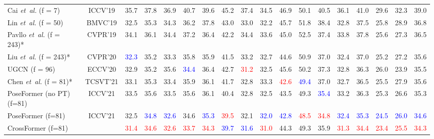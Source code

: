 \documentclass[runningheads]{llncs}
\newcommand{\latinphrase}[1]{\textit{#1}}
\newcommand{\etal}{\latinphrase{et~al.}\xspace}
\begin{document}
\begin{table*}[t]
{\begin{tabular}{l|c|ccccccccccccccc|c}
 Cai \etal \cite{cai2019exploiting} (f = 7) 
& ICCV\textquoteright 19  & 35.7  & 37.8  & 36.9  & 40.7  & 39.6  & 45.2  & 37.4  & 34.5 & 46.9  & 50.1  & 40.5  & 36.1  & 41.0  & 29.6  & 32.3  & 39.0\tabularnewline

Lin \etal \cite{lin2019trajectory} (f = 50)
 & BMVC\textquoteright 19  & 32.5  & 35.3  & 34.3  & 36.2  & 37.8  & 43.0  & 33.0  & 32.2  & 45.7  & 51.8  & 38.4  & 32.8  & 37.5  & 25.8  & 28.9  & 36.8\tabularnewline

Pavllo \etal \cite{pavllo20193d} (f = 243)* 
 & CVPR\textquoteright 19  & 34.1  & 36.1  & 34.4  & 37.2  & 36.4  & 42.2  & 34.4  & 33.6  & 45.0  & 52.5  & 37.4  & 33.8  & 37.8  & 25.6  & 27.3  & 36.5\tabularnewline

Liu \etal \cite{liu2020attention} (f = 243)* 
 & CVPR\textquoteright 20  &\textcolor{blue}{32.3}  & 35.2  & 33.3  & 35.8  & 35.9  & 41.5  & 33.2  & 32.7  & 44.6  & 50.9  & 37.0  & 32.4  & 37.0  & 25.2  & 27.2  & 35.6\tabularnewline

UGCN \cite{wang2020motion} (f = 96) 
 & ECCV\textquoteright 20 & 32.9  & 35.2  & 35.6  & \textcolor{blue}{34.4}  & 36.4  & 42.7  & \textcolor{red}{31.2}  & 32.5  & 45.6  & 50.2  & 37.3  & 32.8  & 36.3  & 26.0  & 23.9  & 35.5\tabularnewline

Chen \etal \cite{chen2021anatomy} (f = 81)* & TCSVT\textquoteright 21  & 33.1 & 35.3  & 33.4  & 35.9  & 36.1 & 41.7  & 32.8 & 33.3  & \textcolor{red}{42.6}  & \textcolor{blue}{49.4}  & 37.0  & 32.7  & 36.5  & 25.5  & 27.9 & 35.6\tabularnewline

PoseFormer (no PT) \cite{poseformer} (f=81) & ICCV'21 & 33.5  & 35.6  & 33.5 & 35.6 & 36.1  & 40.4  & 32.8  & 32.5 & 43.5  & 49.3  & \textcolor{blue}{35.4}  & 33.2 & 36.3  & 25.3 & 26.6  & 35.3\tabularnewline
\hline
PoseFormer \cite{poseformer}(f=81) & ICCV'21 & 32.5  & \textcolor{blue}{34.8}  & \textcolor{blue}{32.6} & 34.6 & \textcolor{blue}{35.3}  & \textcolor{red}{39.5}  & 32.1  & \textcolor{blue}{32.0} & \textcolor{blue}{42.8}  & \textcolor{red}{48.5}  & \textcolor{red}{34.8}  & \textcolor{blue}{32.4} & \textcolor{blue}{35.3}  & \textcolor{blue}{24.5} & \textcolor{blue}{26.0}  & \textcolor{blue}{34.6}\tabularnewline
\hline
CrossFormer (f=81) &  & \textcolor{red}{ 31.4} & \textcolor{red}{34.6}  & \textcolor{red}{32.6}  & \textcolor{red}{33.7}  & \textcolor{red}{34.3} & \textcolor{blue}{39.7}  & \textcolor{blue}{31.6}  & \textcolor{red}{31.0} & 44.3  & 49.3  & 35.9  & \textcolor{red}{31.3}  & \textcolor{red}{34.4}  & \textcolor{red}{ 23.4} & \textcolor{red}{25.5}  & \textcolor{red}{ 34.3}\tabularnewline\end{tabular}}
\label{table:h36}
\end{table*}
\noindent
\end{document}
